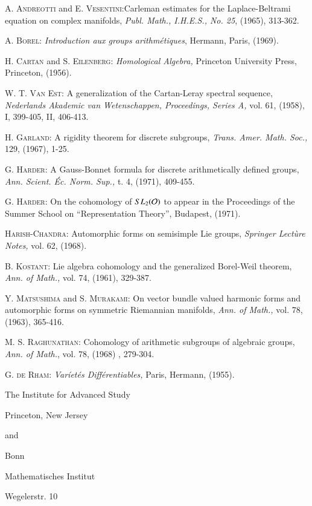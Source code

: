 \begin{thebibliography}{99}
  \textsc{A. Andreotti} and \textsc{E. Vesentini}:\pageoriginale Carleman estimates for the Laplace-Beltrami equation on complex manifolds, \textit{Publ. Math., I.H.E.S., No. 25}, (1965), 313-362.

 \textsc{A. Borel}: \textit{Introduction aux groups arithm\'etiques}, Hermann, Paris, (1969).

 \textsc{H. Cartan} and \textsc{S. Eilenberg}: \textit{Homological Algebra,} Princeton University Press, Princeton, (1956).

 \textsc{W. T. Van Est}: A generalization of the Cartan-Leray spectral sequence, \textit{Nederlands Akademic van Wetenschappen, Proceedings, Series A,} vol. 61, (1958), I, 399-405, II, 406-413.

 \textsc{H. Garland}: A rigidity theorem for discrete subgroups, \textit{Trans. Amer. Math. Soc.,} 129, (1967), 1-25.

 \textsc{G. Harder}: A Gauss-Bonnet formula for discrete arithmetically defined groups, \textit{Ann. Scient. \'Ec. Norm. Sup.,} t. 4, (1971), 409-455.

 \textsc{G. Harder}: On the cohomology of $SL_2 (\mathcal{O})$ to appear in the Proceedings of the Summer School on ``Representation Theory'', Budapest, (1971).

 \textsc{Harish-Chandra}: Automorphic forms on semisimple Lie groups, \textit{Springer Lect\`ure Notes,} vol. 62, (1968).

 \textsc{B. Kostant}: Lie algebra cohomology and the generalized Borel-Weil theorem, \textit{Ann. of Math.,} vol. 74, (1961), 329-387.

 \textsc{Y. Matsushima} and \textsc{S. Murakami}: On vector bundle valued harmonic forms and automorphic forms on symmetric Riemannian manifolds,  \textit{Ann. of Math.,} vol. 78, (1963), 365-416.

 \textsc{M. S. Raghunathan}: Cohomology of arithmetic subgroups of algebraic groups, \textit{Ann. of Math.}, vol. 78, (1968) , 279-304.

 \textsc{G. de Rham}: \textit{Var\'iet\'es Diff\'erentiables,} Paris, Hermann, (1955).
\end{thebibliography}

\bigskip

\noindent
The Institute for Advanced Study

\noindent
Princeton, New Jersey

\medskip
\noindent
{and}
\medskip

 Bonn

\noindent
Mathematisches Institut

\noindent
Wegelerstr. 10



